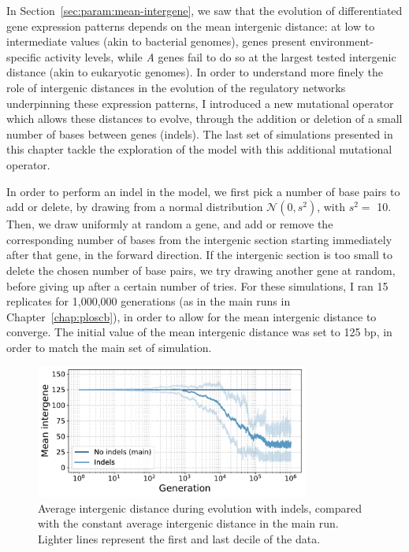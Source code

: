 In Section~\ref{sec:param:mean-intergene}, we saw that the evolution of differentiated gene expression patterns depends on the mean intergenic distance: at low to intermediate values (akin to bacterial genomes), genes present environment-specific activity levels, while \emph{A} genes fail to do so at the largest tested intergenic distance (akin to eukaryotic genomes).
In order to understand more finely the role of intergenic distances in the evolution of the regulatory networks underpinning these expression patterns, I introduced a new mutational operator which allows these distances to evolve, through the addition or deletion of a small number of bases between genes (indels).
The last set of simulations presented in this chapter tackle the exploration of the model with this additional mutational operator.

In order to perform an indel in the model, we first pick a number of base pairs to add or delete, by drawing from a normal distribution $\mathcal{N}(0, s^2)$, with $s^2 = $ 10.
Then, we draw uniformly at random a gene, and add or remove the corresponding number of bases from the intergenic section starting immediately after that gene, in the forward direction.
If the intergenic section is too small to delete the chosen number of base pairs, we try drawing another gene at random, before giving up after a certain number of tries.
For these simulations, I ran 15 replicates for 1,000,000 generations (as in the main runs in Chapter~\ref{chap:ploscb}), in order to allow for the mean intergenic distance to converge.
The initial value of the mean intergenic distance was set to 125 bp, in order to match the main set of simulation.

\begin{figure}[H]
\centering
  \includegraphics[width=0.8\textwidth]{param/evolve-intergene/intergenic_size_all.pdf}
\caption[Average intergenic size during evolution, with indels]{Average intergenic distance during evolution with indels, compared with the constant average intergenic distance in the main run.
Lighter lines represent the first and last decile of the data.}
\label{fig:param:evolve-intergene-intergene}
\end{figure}

